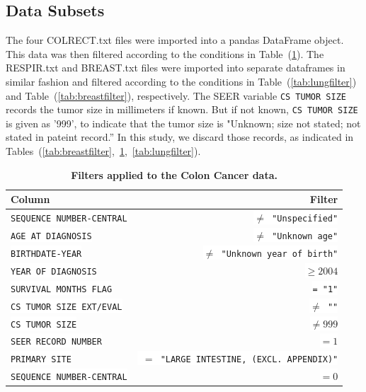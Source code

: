 \documentclass[10pt,letterpaper]{article}
\newcommand{\codewhite}[1]{\colorbox{white}{\texttt{#1}}}
\begin{document}
\subsection*{Data Subsets}
\label{sec:subsets}

 The four COLRECT.txt files were imported into a pandas DataFrame object.
This data was then filtered according to the conditions in Table~(\ref{tab:colonfilter}).
The RESPIR.txt and BREAST.txt files were imported into separate dataframes in similar fashion and filtered according
to the conditions in Table~(\ref{tab:lungfilter}) and Table~(\ref{tab:breastfilter}), respectively.
The SEER variable \codewhite{CS TUMOR SIZE} records the tumor size in millimeters if known. But if not known, \codewhite{CS TUMOR SIZE} is given as '999', to indicate that the tumor size is "Unknown; size not stated; not stated in pateint record.'' In this study, we discard those records, as indicated in Tables~(\ref{tab:breastfilter},~\ref{tab:colonfilter},~\ref{tab:lungfilter}).






\begin{table}[!ht]
\begin{adjustwidth}{-2.25in}{0in} %
\caption{\label{tab:colonfilter} {\bf Filters applied to the Colon Cancer data.}}
\begin{tabular}{lr}
\toprule
 Column &  Filter \\
\midrule
\codewhite{SEQUENCE NUMBER-CENTRAL} & \codewhite{$\neq$ "Unspecified"} \\
\codewhite{AGE AT DIAGNOSIS} & \codewhite{$\neq$ "Unknown age"} \\
\codewhite{BIRTHDATE-YEAR} & \codewhite{$\neq$ "Unknown year of birth"} \\
\codewhite{YEAR OF DIAGNOSIS} & \codewhite{$\geq 2004$} \\
\codewhite{SURVIVAL MONTHS FLAG} & \codewhite{= "1"}\\
\codewhite{CS TUMOR SIZE EXT/EVAL} & \codewhite{$\neq$ ""} \\
\codewhite{CS TUMOR SIZE} & \codewhite{$\neq 999$} \\
\codewhite{SEER RECORD NUMBER} & \codewhite{$= 1$} \\
\codewhite{PRIMARY SITE} & \codewhite{ $=$ "LARGE INTESTINE, (EXCL. APPENDIX)"} \\
\codewhite{SEQUENCE NUMBER-CENTRAL} & \codewhite{$=0$} \\
\bottomrule
\end{tabular}
\end{adjustwidth}
\end{table}
\end{document}
